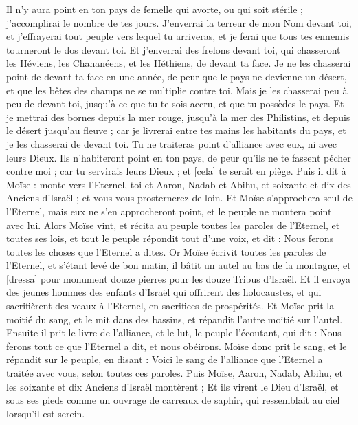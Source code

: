\begin{multicols}{2}
Il n'y aura point en ton pays de femelle qui avorte, ou qui soit stérile ; j'accomplirai le nombre de tes jours.
J'enverrai la terreur de mon Nom devant toi, et j'effrayerai tout peuple vers lequel tu arriveras, et je ferai que tous tes ennemis tourneront le dos devant toi.
Et j'enverrai des frelons devant toi, qui chasseront les Héviens, les Chananéens, et les Héthiens, de devant ta face.
Je ne les chasserai point de devant ta face en une année, de peur que le pays ne devienne un désert, et que les bêtes des champs ne se multiplie contre toi.
Mais je les chasserai peu à peu de devant toi, jusqu'à ce que tu te sois accru, et que tu possèdes le pays.
Et je mettrai des bornes depuis la mer rouge, jusqu'à la mer des Philistins, et depuis le désert jusqu'au fleuve ; car je livrerai entre tes mains les habitants du pays, et je les chasserai de devant toi.
Tu ne traiteras point d'alliance avec eux, ni avec leurs Dieux.
Ils n'habiteront point en ton pays, de peur qu'ils ne te fassent pécher contre moi ; car tu servirais leurs Dieux ; et [cela] te serait en piège.
\VerseOne{}Puis il dit à Moïse : monte vers l'Eternel, toi et Aaron, Nadab et Abihu, et soixante et dix des Anciens d'Israël ; et vous vous prosternerez de loin.
Et Moïse s'approchera seul de l'Eternel, mais eux ne s'en approcheront point, et le peuple ne montera point avec lui.
Alors Moïse vint, et récita au peuple toutes les paroles de l'Eternel, et toutes ses lois, et tout le peuple répondit tout d'une voix, et dit : Nous ferons toutes les choses que l'Eternel a dites.
Or Moïse écrivit toutes les paroles de l'Eternel, et s'étant levé de bon matin, il bâtit un autel au bas de la montagne, et [dressa] pour monument douze pierres pour les douze Tribus d'Israël.
Et il envoya des jeunes hommes des enfants d'Israël qui offrirent des holocaustes, et qui sacrifièrent des veaux à l'Eternel, en sacrifices de prospérités.
Et Moïse prit la moitié du sang, et le mit dans des bassins, et répandit l'autre moitié sur l'autel.
Ensuite il prit le livre de l'alliance, et le lut, le peuple l'écoutant, qui dit : Nous ferons tout ce que l'Eternel a dit, et nous obéirons.
Moïse donc prit le sang, et le répandit sur le peuple, en disant : Voici le sang de l'alliance que l'Eternel a traitée avec vous, selon toutes ces paroles.
Puis Moïse, Aaron, Nadab, Abihu, et les soixante et dix Anciens d'Israël montèrent ;
Et ils virent le Dieu d'Israël, et sous ses pieds comme un ouvrage de carreaux de saphir, qui ressemblait au ciel lorsqu'il est serein.

\end{multicols}
